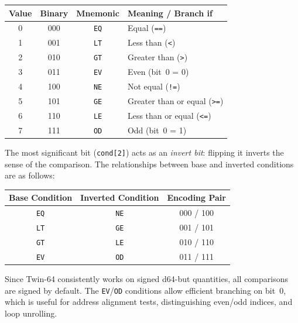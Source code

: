 \begin{center}
\begin{tabular}{|c|c|c|l|}
\hline
\textbf{Value} & \textbf{Binary} & \textbf{Mnemonic} & \textbf{Meaning / Branch if} \\ \hline
0 & 000 & \texttt{EQ} & Equal (\texttt{==}) \\ \hline
1 & 001 & \texttt{LT} & Less than (\texttt{<}) \\ \hline
2 & 010 & \texttt{GT} & Greater than (\texttt{>}) \\ \hline
3 & 011 & \texttt{EV} & Even (bit~0 = 0) \\ \hline
4 & 100 & \texttt{NE} & Not equal (\texttt{!=}) \\ \hline
5 & 101 & \texttt{GE} & Greater than or equal (\texttt{>=}) \\ \hline
6 & 110 & \texttt{LE} & Less than or equal (\texttt{<=}) \\ \hline
7 & 111 & \texttt{OD} & Odd (bit~0 = 1) \\ \hline
\end{tabular}
\end{center}

The most significant bit (\texttt{cond[2]}) acts as an \emph{invert bit}: flipping it inverts the sense of the comparison. The relationships between base and inverted conditions are as follows:

\begin{center}
\begin{tabular}{|c|c|c|}
\hline
\textbf{Base Condition} & \textbf{Inverted Condition} & \textbf{Encoding Pair} \\ \hline
\texttt{EQ} & \texttt{NE} & 000 / 100 \\ \hline
\texttt{LT} & \texttt{GE} & 001 / 101 \\ \hline
\texttt{GT} & \texttt{LE} & 010 / 110 \\ \hline
\texttt{EV} & \texttt{OD} & 011 / 111 \\ \hline
\end{tabular}
\end{center}

Since Twin-64 consistently works on signed d64-but quantities, all comparisons are signed by default. The \texttt{EV}/\texttt{OD} conditions allow efficient branching on bit~0, which is useful for address alignment tests, distinguishing even/odd indices, and loop unrolling.
